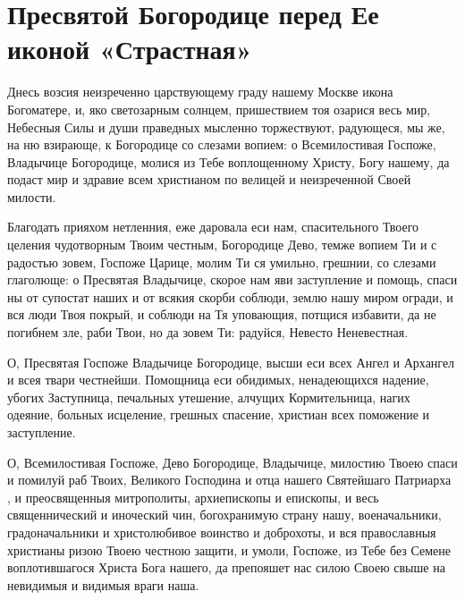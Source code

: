 \mychapterending


\section{Пресвятой Богородице перед Ее иконой «Страстная»}\begin{mymulticols}



Днесь возсия неизреченно царствующему граду нашему Москве икона Богоматере, и, яко светозарным солнцем, пришествием тоя озарися весь мир, Небесныя Силы и души праведных мысленно торжествуют, радующеся, мы же, на ню взирающе, к Богородице со слезами вопием: о Всемилостивая Госпоже, Владычице Богородице, молися из Тебе воплощенному Христу, Богу нашему, да подаст мир и здравие всем христианом по велицей и неизреченной Своей милости.


Благодать прияхом нетленния, еже даровала еси нам, спасительного Твоего целения чудотворным Твоим честным, Богородице Дево, темже вопием Ти и с радостью зовем, Госпоже Царице, молим Ти ся умильно, грешнии, со слезами глаголюще: о Пресвятая Владычице, скорое нам яви заступление и помощь, спаси ны от супостат наших и от всякия скорби соблюди, землю нашу миром огради, и вся люди Твоя покрый, и соблюди на Тя уповающия, потщися избавити, да не погибнем зле, раби Твои, но да зовем Ти: радуйся, Невесто Неневестная.


О, Пресвятая Госпоже Владычице Богородице, высши еси всех Ангел и Архангел и всея твари честнейши. Помощница еси обидимых, ненадеющихся надение, убогих Заступница, печальных утешение, алчущих Кормительница, нагих одеяние, больных исцеление, грешных спасение, христиан всех поможение и заступление. 

О, Всемилостивая Госпоже, Дево Богородице, Владычице, милостию Твоею спаси и помилуй раб Твоих, Великого Господина и отца нашего Святейшаго Патриарха , и преосвященныя митрополиты, архиепископы и епископы, и весь священнический и иноческий чин, богохранимую страну нашу, военачальники, градоначальники и христолюбивое воинство и доброхоты, и вся православныя христианы ризою Твоею честною защити, и умоли, Госпоже, из Тебе без Семене воплотившагося Христа Бога нашего, да препояшет нас силою Своею свыше на невидимыя и видимыя враги наша. 


\end{mymulticols}
